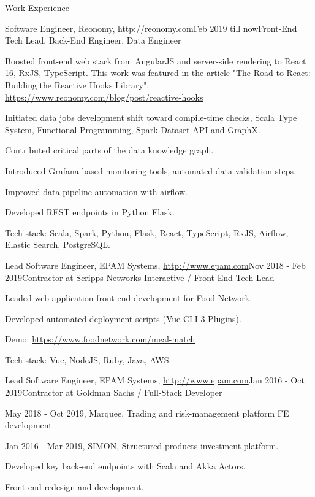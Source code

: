 \documentclass{resume}
\begin{document}
\begin{rSection}{Work Experience}

\begin{rSubsection}{Software Engineer, Reonomy, \url{http://reonomy.com}}{Feb 2019 till now}{Front-End Tech Lead, Back-End Engineer, Data Engineer}{}
\item Boosted front-end web stack from AngularJS and server-side rendering to React 16, RxJS, TypeScript.
This work was featured in the article "The Road to React: Building the Reactive Hooks Library".
\url{https://www.reonomy.com/blog/post/reactive-hooks}
\item Initiated data jobs development shift toward compile-time checks, 
Scala Type System, Functional Programming, Spark Dataset API and GraphX.
\item Contributed critical parts of the data knowledge graph.
\item Introduced Grafana based monitoring tools, automated data validation steps.
\item Improved data pipeline automation with airflow.
\item Developed REST endpoints in Python Flask.

Tech stack: Scala, Spark, Python, Flask, React, TypeScript, RxJS, Airflow, Elastic Search, PostgreSQL.
\end{rSubsection}

\begin{rSubsection}{Lead Software Engineer, EPAM Systems, \url{http://www.epam.com}}{Nov 2018 - Feb 2019}{Contractor at Scripps Networks Interactive / Front-End Tech Lead}{}
\item Leaded web application front-end development for Food Network.
\item Developed automated deployment scripts (Vue CLI 3 Plugins).

Demo: \url{https://www.foodnetwork.com/meal-match}

Tech stack: Vue, NodeJS, Ruby, Java, AWS.
\end{rSubsection}

\begin{rSubsection}{Lead Software Engineer, EPAM Systems, \url{http://www.epam.com}}{Jan 2016 - Oct 2019}{Contractor at Goldman Sachs / Full-Stack Developer}{}
\item May 2018 - Oct 2019, Marquee, Trading and risk-management platform FE development.
\item Jan 2016 - Mar 2019, SIMON, Structured products investment platform.
\item Developed key back-end endpoints with Scala and Akka Actors.
\item Front-end redesign and development. 


\end{rSubsection}
\end{rSection}
\end{document}
